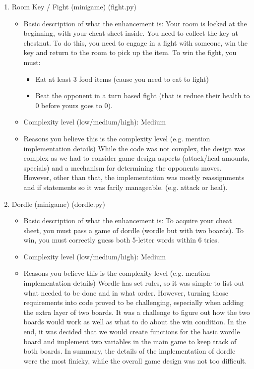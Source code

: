 \documentclass[11pt]{article}
\begin{document}
\begin{enumerate}
\item Room Key / Fight (minigame) (fight.py)
	\begin{itemize}
	\item Basic description of what the enhancement is: Your room is locked at the beginning, with your cheat sheet inside. You need to collect the key at chestnut.
	To do this, you need to engage in a fight with someone, win the key and return to the room to pick up the item.
	To win the fight, you must:
            \begin{itemize}
            \item Eat at least 3 food items (cause you need to eat to fight)
            \item Beat the opponent in a turn based fight (that is reduce their health to 0 before yours goes to 0).
            \end{itemize}
	\item Complexity level (low/medium/high): Medium
	\item Reasons you believe this is the complexity level (e.g. mention implementation details)
	While the code was not complex, the design was complex as we had to consider game design aspects (attack/heal amounts,
	specials) and a mechanism for determining the opponents moves. However, other than that, the implementation was mostly
	reassignments and if statements so it was farily manageable.
	  (e.g. attack or heal).
	\end{itemize}


\item Dordle (minigame) (dordle.py)
	\begin{itemize}
	\item Basic description of what the enhancement is: To acquire your cheat sheet, you must pass a game of dordle
	(wordle but with two boards). To win, you must correctly guess both 5-letter words within 6 tries.
	\item Complexity level (low/medium/high): Medium
	\item Reasons you believe this is the complexity level (e.g. mention implementation details)
	Wordle has set rules, so it was simple to list out what needed to be done and in what order. However, turning those
	requirements into code proved to be challenging, especially when adding the extra layer of two boards. It was a
	challenge to figure out how the two boards would work as well as what to do about the win condition. In the end, it
	was decided that we would create functions for the basic wordle board and implement two variables in the main game
	to keep track of both boards. In summary, the details of the implementation of dordle were the most finicky, while
	the overall game design was not too difficult.
	\end{itemize}



\end{enumerate}
\end{document}

